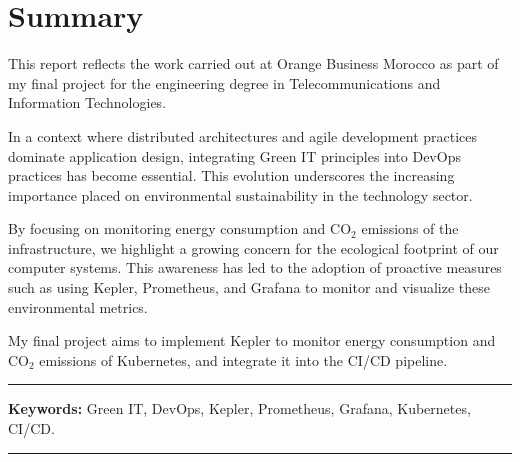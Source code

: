 \chapter*{Summary}

This report reflects the work carried out at Orange Business Morocco as part of my final project for the engineering degree in Telecommunications and Information Technologies.

In a context where distributed architectures and agile development practices dominate application design, integrating Green IT principles into DevOps practices has become essential. This evolution underscores the increasing importance placed on environmental sustainability in the technology sector.

By focusing on monitoring energy consumption and CO$_2$ emissions of the infrastructure, we highlight a growing concern for the ecological footprint of our computer systems. This awareness has led to the adoption of proactive measures such as using Kepler, Prometheus, and Grafana to monitor and visualize these environmental metrics.

My final project aims to implement Kepler to monitor energy consumption and CO$_2$ emissions of Kubernetes, and integrate it into the CI/CD pipeline.

\noindent\rule[2pt]{\textwidth}{0.5pt}

{\textbf{Keywords:}}
Green IT, DevOps, Kepler, Prometheus, Grafana, Kubernetes, CI/CD. 

\noindent\rule[2pt]{\textwidth}{0.5pt}